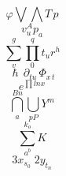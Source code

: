 \begin{equation}  \varphi \bigvee \bigwedge T \, p \end{equation}
\begin{equation}v^A_u p_a\end{equation}
\begin{equation}  \sum_v^g \prod_0^q t_u r^h \end{equation}
\begin{equation} \hslash \, \partial_{tu} \, \Phi_{x \, t} \end{equation}
\begin{equation} e^{\prod ln x} \end{equation}
\begin{equation}  \bigcap_{a}^{Bn} \bigcup_{pP} Y^m \end{equation}
\begin{equation}  \sum_{a^b}^{k_o} K \end{equation}
\begin{equation} 3x_{s_0} \; 2 y_{t_n}  \end{equation}